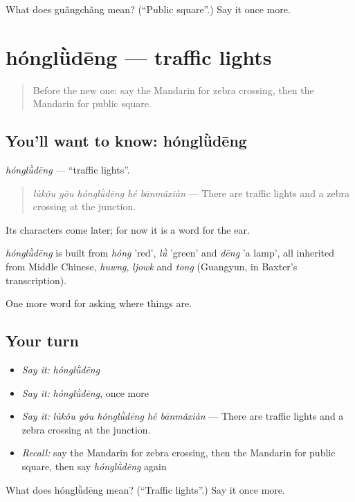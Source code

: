 \begin{tcolorbox}[breakable,colback=teal!4,colframe=teal!35!black,title={Before you move on}]
What does guǎngchǎng mean? (\textquotedblleft{}Public square\textquotedblright{}.) Say it once more.
\end{tcolorbox}
\section[hónglǜdēng]{hónglǜdēng — traffic lights}

\label{lesson:ZH-C194-hongludeng}



\begin{quote}
Before the new one: say the Mandarin for zebra crossing, then the Mandarin for public square.
\end{quote}

\subsection*{You'll want to know: hónglǜdēng}
\emph{hónglǜdēng} — \textquotedblleft{}traffic lights\textquotedblright{}.

\begin{quote}
\emph{lùkǒu yǒu hónglǜdēng hé bānmǎxiàn} — There are traffic lights and a zebra crossing at the junction.
\end{quote}

Its characters come later; for now it is a word for the ear.

\begin{cousinweb}
\emph{hónglǜdēng} is built from \emph{hóng} 'red', \emph{lǜ} 'green' and \emph{dēng} 'a lamp', all inherited from Middle Chinese, \emph{huwng}, \emph{ljowk} and \emph{tong} (Guangyun, in Baxter's transcription).
\end{cousinweb}

\begin{grammarlens}[title={What you've built}]
One more word for asking where things are.
\end{grammarlens}

\subsection*{Your turn}
\begin{itemize}
\raggedright
  \item \emph{Say it:} \emph{hónglǜdēng}
  \item \emph{Say it:} \emph{hónglǜdēng}, once more
  \item \emph{Say it:} \emph{lùkǒu yǒu hónglǜdēng hé bānmǎxiàn} — There are traffic lights and a zebra crossing at the junction.
  \item \emph{Recall:} say the Mandarin for zebra crossing, then the Mandarin for public square, then say \emph{hónglǜdēng} again
\end{itemize}

\begin{tcolorbox}[breakable,colback=teal!4,colframe=teal!35!black,title={Before you move on}]
What does hónglǜdēng mean? (\textquotedblleft{}Traffic lights\textquotedblright{}.) Say it once more.
\end{tcolorbox}
